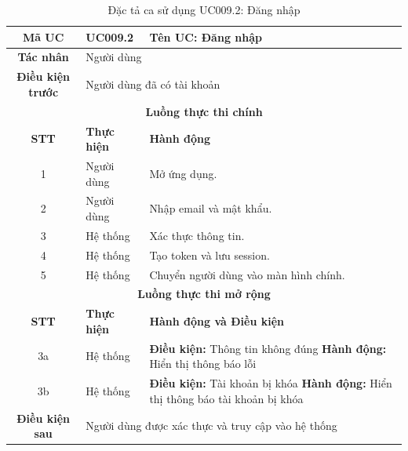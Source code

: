 \begin{table}[H]
    \centering
    \label{tab:uc009-2}
    \begin{tabularx}{\textwidth}{|c|p{3.5cm}|X|}
        \hline
        \rowcolor{headergreen} 
        \textbf{Mã UC} & \textbf{UC009.2} & \textbf{Tên UC: Đăng nhập} \\ \hline
        \textbf{Tác nhân} & \multicolumn{2}{l|}{Người dùng} \\ \hline
        \textbf{Điều kiện trước} & \multicolumn{2}{X|}{Người dùng đã có tài khoản} \\ \hline
        
        \multicolumn{3}{|c|}{\cellcolor{headerorange}\textbf{Luồng thực thi chính}} \\ \hline
        \rowcolor{graybg} \textbf{STT} & \textbf{Thực hiện} & \textbf{Hành động} \\ \hline
        1 & Người dùng & Mở ứng dụng. \\ \hline
        2 & Người dùng & Nhập email và mật khẩu. \\ \hline
        3 & Hệ thống & Xác thực thông tin. \\ \hline
        4 & Hệ thống & Tạo token và lưu session. \\ \hline
        5 & Hệ thống & Chuyển người dùng vào màn hình chính. \\ \hline
        
        \multicolumn{3}{|c|}{\cellcolor{headerorange}\textbf{Luồng thực thi mở rộng}} \\ \hline
        \rowcolor{graybg} \textbf{STT} & \textbf{Thực hiện} & \textbf{Hành động và Điều kiện} \\ \hline
        3a & Hệ thống & \textbf{Điều kiện:} Thông tin không đúng \newline \textbf{Hành động:} Hiển thị thông báo lỗi \\ \hline
        3b & Hệ thống & \textbf{Điều kiện:} Tài khoản bị khóa \newline \textbf{Hành động:} Hiển thị thông báo tài khoản bị khóa \\ \hline
        
        \textbf{Điều kiện sau} & \multicolumn{2}{X|}{Người dùng được xác thực và truy cập vào hệ thống} \\ \hline
    \end{tabularx}
    \caption{Đặc tả ca sử dụng UC009.2: Đăng nhập}
\end{table}

